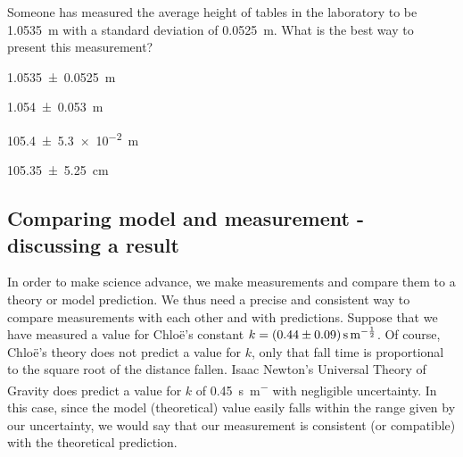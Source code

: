 \begin{checkpointMC}{Someone has measured the average height of tables in the laboratory to be \SI{1.0535}{m} with a standard deviation of \SI{0.0525}{m}. What is the best way to present this measurement?}
\item \SI{1.0535\pm 0.0525}{m}
\item \SI{1.054\pm 0.053}{m}
\item \SI{105.4\pm 5.3e-2}{m}
\item \SI{105.35\pm 5.25}{cm}
\end{checkpointMC}

\subsection{Comparing model and measurement - discussing a result}
In order to make science advance, we make measurements and compare them to a theory or model prediction. We thus need a precise and consistent way to compare measurements with each other and with predictions. Suppose that we have measured a value for Chlo\"e's constant $k= \SI{0.44 \pm 0.09}{s.m^{-\frac{1}{2}}}$. Of course, Chlo\"e's theory does not predict a value for $k$, only that fall time is proportional to the square root of the distance fallen. Isaac Newton's Universal Theory of Gravity does predict a value for $k$ of \SI{0.45}{s.m^{-}} with negligible uncertainty. In this case, since the model (theoretical) value easily falls within the range given by our uncertainty, we would say that our measurement is consistent (or compatible) with the theoretical prediction. 

